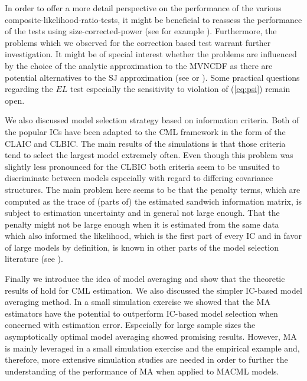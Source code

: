 \documentclass[12pt, a4paper]{article}
\numberwithin{defcounter}{section}
\numberwithin{excounter}{section}
\begin{document}
In order to offer a more detail perspective on the performance of the various composite-likelihood-ratio-tests, it might be beneficial to reassess the performance of the tests using size-corrected-power (see for example \citep{davidson1984}). Furthermore, the problems which we observed for the correction based test warrant further investigation. It might be of special interest whether the problems are influenced by the choice of the analytic approximation to the \ac{MVNCDF} as there are potential alternatives to the \ac{SJ} approximation (see \cite{connors2014} or \cite{batram2016}). Some practical questions regarding the $EL$ test especially the sensitivity to violation of (\ref{eq:psi}) remain open.

We also discussed model selection strategy based on information criteria. Both of the popular \ac{IC}s have been adapted to the \ac{CML} framework in the form of the \ac{CLAIC} and \ac{CLBIC}. The main results of the simulations is that those criteria tend to select the largest model extremely often. Even though this problem was slightly less pronounced for the \ac{CLBIC} both criteria seem to be unsuited to discriminate between models especially with regard to differing covariance structures. The main problem here seems to be that the penalty terms, 
which are computed as the trace of (parts of) the estimated sandwich information matrix, is subject to estimation uncertainty and in general not large enough. That the penalty might not be large enough when it is estimated from the same data which also informed the likelihood, which is the first part of every \ac{IC} and in favor of large models by definition, is known in other parts of the model selection literature (see \cite{greven2010}).


Finally we introduce the idea of model averaging and show that the theoretic results of \cite{hjort2003} hold for \ac{CML} estimation. We also discussed the simpler \ac{IC}-based model averaging method. In a small simulation exercise we showed that the \ac{MA} estimators have the potential to outperform \ac{IC}-based model selection when concerned with estimation error. Especially for large sample sizes the asymptotically optimal model averaging showed promising results. However, \ac{MA} is mainly leveraged in a small simulation exercise and the empirical example and, therefore, more extensive simulation studies are needed in order to further the understanding of the performance of \ac{MA} when applied to \ac{MACML} models. 
\end{document}
